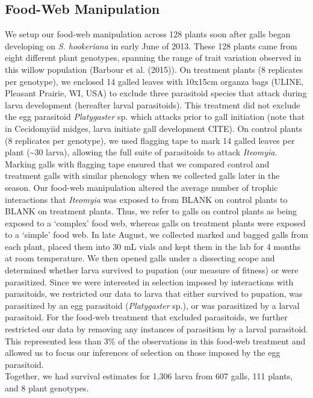 \documentclass[]{elsarticle} %
\begin{document}
\subsection{Food-Web Manipulation}\label{food-web-manipulation}

We setup our food-web manipulation across 128 plants soon after galls
began developing on \emph{S. hookeriana} in early June of 2013. These
128 plants came from eight different plant genotypes, spanning the range
of trait variation observed in this willow population (Barbour et al.
(2015)). On treatment plants (8 replicates per genotype), we enclosed 14
galled leaves with 10x15cm organza bags (ULINE, Pleasant Prairie, WI,
USA) to exclude three parasitoid species that attack during larva
development (hereafter larval parasitoids). This treatment did not
exclude the egg parasitoid \emph{Platygaster} sp. which attacks prior to
gall initiation (note that in Cecidomyiid midges, larva initiate gall
development CITE). On control plants (8 replicates per genotype), we
used flagging tape to mark 14 galled leaves per plant
(\textasciitilde{}30 larva), allowing the full suite of parasitoids to
attack \emph{Iteomyia}. Marking galls with flagging tape ensured that we
compared control and treatment galls with similar phenology when we
collected galls later in the season. Our food-web manipulation altered
the average number of trophic interactions that \emph{Iteomyia} was
exposed to from BLANK on control plants to BLANK on treatment plants.
Thus, we refer to galls on control plants as being exposed to a
`complex' food web, whereas galls on treatment plants were exposed to a
`simple' food web. In late August, we collected marked and bagged galls
from each plant, placed them into 30 mL vials and kept them in the lab
for 4 months at room temperature. We then opened galls under a
dissecting scope and determined whether larva survived to pupation (our
measure of fitness) or were parasitized. Since we were interested in
selection imposed by interactions with parasitoids, we restricted our
data to larva that either survived to pupation, was parasitized by an
egg parasitoid (\emph{Platygaster} sp.), or was parasitized by a larval
parasitoid. For the food-web treatment that excluded parasitoids, we
further restricted our data by removing any instances of parasitism by a
larval parasitoid. This represented less than 3\% of the observations in
this food-web treatment and allowed us to focus our inferences of
selection on those imposed by the egg parasitoid.\\
Together, we had survival estimates for 1,306 larva from 607 galls, 111
plants, and 8 plant genotypes.
\end{document}
